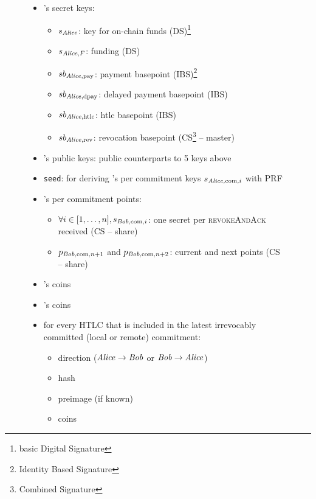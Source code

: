   \begin{figure}[H]
  \centering
  \begin{mdframed}
    \begin{itemize}
      \item \alice's secret keys:
      \begin{itemize}
        \item $s_{\mathit{Alice}}$: key for on-chain funds (DS)\footnote{basic Digital
        Signature}
        \item $s_{\mathit{Alice}, F}$: funding (DS)
        \item $sb_{\mathit{Alice}, \mathrm{pay}}$: payment basepoint
        (IBS)\footnote{Identity Based Signature}
        \item $sb_{\mathit{Alice}, \mathrm{dpay}}$: delayed payment basepoint (IBS)
        \item $sb_{\mathit{Alice}, \mathrm{htlc}}$: htlc basepoint (IBS)
        \item $sb_{\mathit{Alice}, \mathrm{rev}}$: revocation basepoint
        (CS\footnote{Combined Signature} -- master)
      \end{itemize}
      \item \bob's public keys: public counterparts to 5 keys above
      \item \texttt{seed}: for deriving \alice's per commitment keys $s_{\mathit{Alice},
      \mathrm{com}, i}$ with PRF
      \item \bob's per commitment points:
      \begin{itemize}
        \item $\forall i \in [1, \dots, n], s_{\mathit{Bob}, \mathrm{com}, i}$: one
        secret per \textsc{revokeAndAck} received (CS -- share)
        \item $p_{\mathit{Bob}, \mathrm{com}, n+1}$ and $p_{\mathit{Bob}, \mathrm{com}, n+2}$:
        current and next points (CS -- share)
      \end{itemize}
      \item \alice's coins
      \item \bob's coins
      \item for every HTLC that is included in the latest irrevocably committed
      (local or remote) commitment:
        \begin{itemize}
          \item direction ($\mathit{Alice} \rightarrow \mathit{Bob}$ or $\mathit{Bob} \rightarrow \mathit{Alice}$)
          \item hash
          \item preimage (if known)
          \item coins

\end{itemize}
\end{itemize}
\end{mdframed}
\end{figure}
